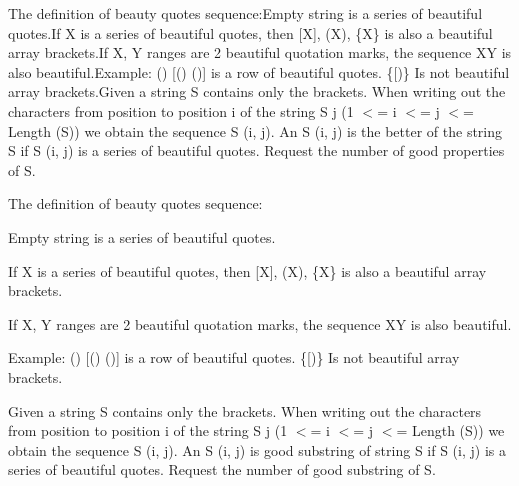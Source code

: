 The definition of beauty quotes sequence:Empty string is a series of beautiful quotes.If X is a series of beautiful quotes, then [X], (X), \{X\} is also a beautiful array brackets.If X, Y ranges are 2 beautiful quotation marks, the sequence XY is also beautiful.Example: () [() ()] is a row of beautiful quotes. \{[)\} Is not beautiful array brackets.Given a string S contains only the brackets. When writing out the characters from position to position i of the string S j (1 $<$= i $<$= j $<$= Length (S)) we obtain the sequence S (i, j). An S (i, j) is the better of the string S if S (i, j) is a series of beautiful quotes. Request the number of good properties of S.

The definition of beauty quotes sequence:

Empty string is a series of beautiful quotes.

If X is a series of beautiful quotes, then [X], (X), \{X\} is also a beautiful array brackets.

If X, Y ranges are 2 beautiful quotation marks, the sequence XY is also beautiful.

Example: () [() ()] is a row of beautiful quotes. \{[)\} Is not beautiful array brackets.

Given a string S contains only the brackets. When writing out the characters from position to position i of the string S j (1 $<$= i $<$= j $<$= Length (S)) we obtain the sequence S (i, j). An S (i, j) is good substring of string S if S (i, j) is a series of beautiful quotes. Request the number of good substring of S.
